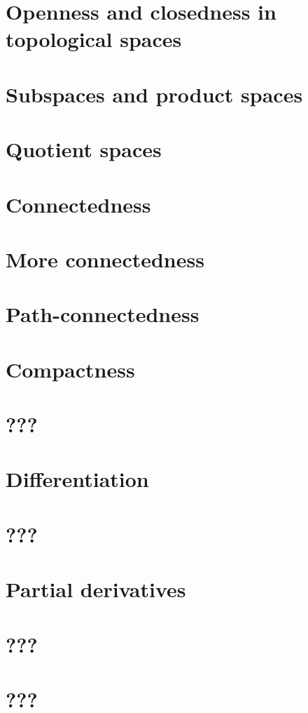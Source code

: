 \documentclass{article}
\begin{document}
\section{Openness and closedness in topological spaces}

\section{Subspaces and product spaces}

\section{Quotient spaces}

\section{Connectedness}

\section{More connectedness}

\section{Path-connectedness}

\section{Compactness}

\section{???}

\section{Differentiation}

\section{???}

\section{Partial derivatives}

\section{???}

\section{???}

\end{document}
